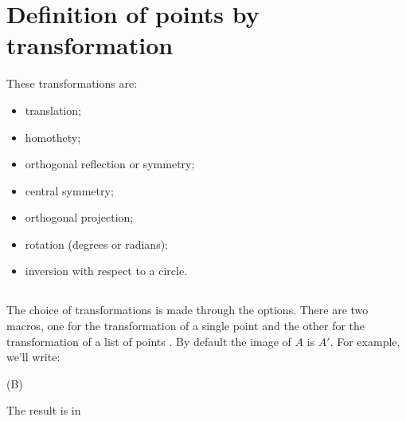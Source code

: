 \section{Definition of points by transformation}
These transformations are:

\begin{itemize}
   \item translation;
   \item homothety;
   \item orthogonal reflection or symmetry;
   \item central symmetry;
   \item orthogonal projection;
   \item rotation (degrees or radians);
   \item inversion with respect to a circle.
\end{itemize}

\subsection{}
The choice of transformations is made through the options. There are two macros, one for the transformation of a single point  and the other for the transformation of a list of points . By default the image of $A$ is $A'$. For example, we'll write:
\begin{tkzltxexample}[]
\tkzDefPointBy[translation= from A to A'](B) 
\end{tkzltxexample}
The result is in 

